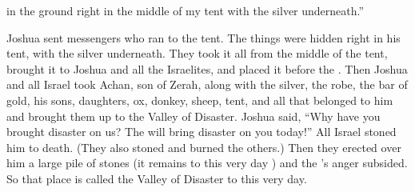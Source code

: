 {in the ground
right in the middle
of my tent
with the silver
underneath.”
\par }{\PP {}Joshua
sent
messengers
who ran
to the tent.
The things were hidden
right in his tent,
with the silver
underneath.
They took
it all from the middle
of the tent,
brought
it to
Joshua
and all
the Israelites,
and placed
it before
the {}.
Then Joshua
and all
Israel
took
Achan,
son
of Zerah,
along with the
silver,
the
robe,
the bar
of gold,
his sons,
daughters,
ox,
donkey,
sheep,
tent,
and all
that belonged
to
him and brought
them up
to the
Valley
of Disaster.
Joshua
said,
“Why
have you brought disaster
on us? The
{}
will bring disaster
on you today!” All
Israel
stoned
him to death. (They also stoned
and burned the others.)
Then they erected
over
him a large
pile
of stones
(it remains to
this
very day
) and the
{}’s
anger
subsided.
So
that place
is
called
the Valley
of Disaster
to
this
very day.

}
